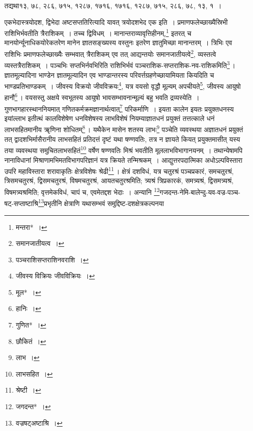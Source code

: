 \documentclass[10pt, openany]{book}
\begin{document}
{तद्यथा\textemdash१३, ७८, २८६, ७१५, १२८७, १७१६, १७१६, १२८७, ७१५, २८६, ७८, १३, १~।}


\newpage

{एकभेदास्त्रयोदश, द्विभेदा अष्टसप्ततिरित्यादि यावत् त्रयोदशभेद एक इति~।
प्रमाणफलेच्छाख्यैस्रिभी राशिभिर्भवतीति त्रैराशिकम्~। तच्च द्विविधम्~।
मानान्तराव्यावृत्तिहीनम्,\renewcommand{\thefootnote}{\s १}\footnote{\s मन्तरा*~।}}
{इतरत् च मानयोर्न्यूनाधिकयोरेकतरेण मानेन ज्ञातसङ्ख्यस्य वस्तुनः इतरेण
ज्ञातुमिच्छा मानान्तरम्~।
त्रिभिः एव राशिभिः प्रमाणफलेच्छाख्यैः सम्भवात् त्रैराशिकम् एव तत्
आद्यन्तयोः}
{समानजातीयत्वे\renewcommand{\thefootnote}{\s २}\footnote{\s समानजातीयत्व~।}, व्यस्तत्वे व्यस्तत्रैराशिकम्~। पञ्चभिः
सप्तभिर्नवभिरिति राशिभिर्भवं}
{पञ्चराशिक-सप्तराशिक-नव-राशिकमिति\renewcommand{\thefootnote}{\s ३}\footnote{\s पञ्चराशिसप्तराशिनवराशि~।}\,। ज्ञातमूल्यादिना भाण्डेन
ज्ञातमूल्यादिन एव}
{भाण्डान्तरस्य परिवर्त्तग्रहणेच्छायामियता 
कियदिति च भाण्डप्रतिभाण्डकम्~।
जीवस्य विक्रयो}
{जीवविक्रयः\renewcommand{\thefootnote}{\s ४}\footnote{\s जीवस्य विक्रियः जीवविक्रियः~।}, यत्र वयसो वृद्धौ मूल्यम् अपचीयते\renewcommand{\thefootnote}{\s ५}\footnote{\s मूल*~।}, जीवस्य आयुषो
हानौ\renewcommand{\thefootnote}{\s ६}\footnote{\s हानिः~।}\,। वयसस्तु अक्षये}
{स्वभूतस्य आयुषो भावसम्भावनान्मूल्यं बहु भवति द्रव्यस्येति~।
गुणभागहारस्थाननियमात्}
{गणितकर्मक्रमज्ञानार्थत्वात्\renewcommand{\thefootnote}{\s ७}\footnote{\s गुणित*~।} परिकर्माणि~। इयता कालेन इयतः
प्रयुक्तधनस्य इयांल्लाभ इतीत्थं}
{कालविशेषेण धनविशेषस्य लाभविशेषं नियम्याज्ञातधनं प्रयुक्तं तत्तत्काले
धनं लाभसहितमानीय ॠणिना शोधितम्\renewcommand{\thefootnote}{\s ८}\footnote{\s छौकितं~।}\,। यथैकेन मासेन शतस्य लाभः\renewcommand{\thefootnote}{\s ९}\footnote{\s लाभ~।} पञ्चेति व्यवस्थया
अज्ञातधनं}
{प्रयुक्तं तत् द्वादशभिर्मासैरानीय लाभसहितं प्रतिदत्तं दृष्टं यथा
षण्णवतिः, तत्र न ज्ञायते कियत्}
{प्रयुक्तमासीत् यस्य तया व्यवस्थया समुचितलाभसहितं\renewcommand{\thefootnote}{\s १०}\footnote{\s लाभसहित~।} वर्षेण षण्णवतिः
मिश्रं भवतीति}
{मूललाभविभागानयनम्~। तथान्येषामपि नानाविधानां
मिश्राणामभिमतविभागपरिज्ञानं यत्र}
{क्रियते तन्मिश्रकम्~। आद्युत्तरपदात्मिका अधोऽल्पविस्तारा उपरि
महाविस्तारा शरावाकृतिः}
{क्षेत्रविशेषः श्रेढी\renewcommand{\thefootnote}{\s ११}\footnote{\s श्रेष्टी~।}\,। क्षेत्रं दशविधं, यत्र चतुरश्रं
पञ्चप्रकारं, समचतुरश्रं, त्रिसमचतुरश्रं,}
{द्विसमचतुरश्रं, विषमचतुरश्रं, आयतचतुरश्रमिति; त्र्यश्रं त्रिप्रकारकं,
समत्र्यश्रं, द्विसमत्र्यश्रं,} 
विषमत्र्यश्रमिति; वृत्तमेकविधं, चापं च, एवमेतद्दश भेदाः~। अन्यानि
\renewcommand{\thefootnote}{\s १२}\footnote{\s जगदन्त*~।}गजदन्त-नेमि-बालेन्दु-यव-वज्र-पञ्च-षट्-सप्ताष्टाश्रि\renewcommand{\thefootnote}{\s १३}\footnote{\s वज्रषट्अष्टाश्रि~।}{प्रभृतीनि क्षेत्राणि यथासम्भवं
समुद्दिष्ट-दशक्षेत्रकल्पनया}
\end{document}
